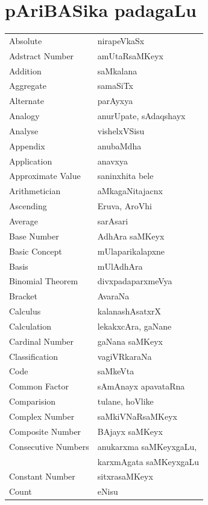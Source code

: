 \eject
\section*{\hspace{3.5cm}pAriBASika padagaLu}

\vskip -10pt
\begin{longtable}{>{\rm}l@{\hspace{2cm}}l}
Absolute & nirapeVkaSx\\
Adstract Number & amUtaRsaMKeyx\\
Addition & saMkalana\\
Aggregate & samaSiTx\\
Alternate & parAyxya\\
Analogy & anurUpate, sAdaqshayx\\
Analyse & vishelxVSisu\\
Appendix & anubaMdha\\
Application & anavxya \\
Approximate Value & saninxhita bele\\
Arithmetician & aMkagaNitajacnx\\
Ascending & Eruva, AroVhi\\
Average & sarAsari \\
Base Number & AdhAra saMKeyx\\
Basic Concept & mUlaparikalapxne\\
Basis & mUlAdhAra \\
Binomial Theorem & divxpadaparxmeVya\\
Bracket & AvaraNa\\
Calculus & kalanashAsatxrX\\
Calculation & lekakxcAra, gaNane\\
Cardinal Number & gaNana saMKeyx\\
Classification & vagiVRkaraNa\\
Code & saMkeVta\\
Common Factor & sAmAnayx apavataRna\\
Comparision & tulane, hoVlike\\
Complex Number & saMkiVNaRsaMKeyx\\
Composite Number & BAjayx saMKeyx\\
Consecutive Numbers & anukarxma saMKeyxgaLu,\\
                    & karxmAgata saMKeyxgaLu\\
Constant Number & sitxrasaMKeyx\\
Count & eNisu\\

\end{longtable}
